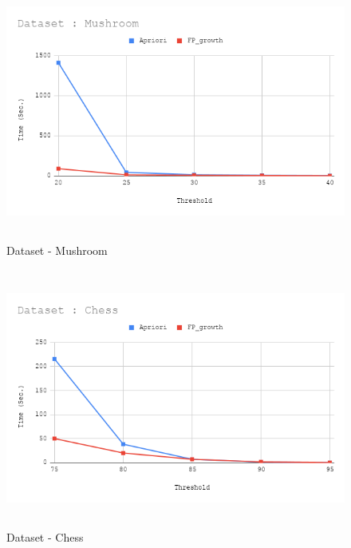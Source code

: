 \documentclass[12pt]{article}
\begin{document}
\maketitle
\thispagestyle{empty}
\clearpage
\newpage

\begin{figure}[ht!]
	\centering
	\includegraphics[width = 0.95\columnwidth, height = 8.5cm]{Mushroom.png}
	\caption{Dataset - Mushroom}
	\label{fig:mushroom}
\end{figure}

\begin{figure}[ht!]
	\centering
	\includegraphics[width = 0.95\columnwidth, height = 8.5cm]{Chess.png}
	\caption{Dataset - Chess}
	\label{fig:chess}
\end{figure}
\end{document}
